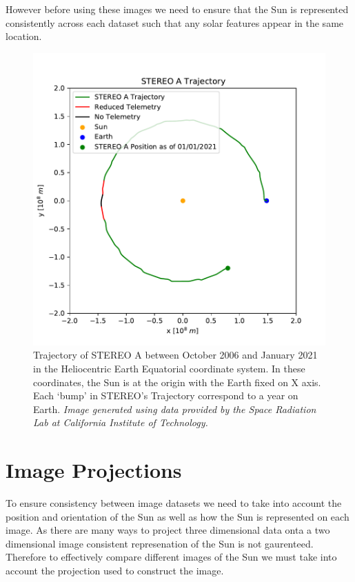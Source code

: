 \documentclass[11pt,a4paper,onecolumn]{report}
\begin{document}
However before using these images we need to ensure that the Sun is represented
consistently across each dataset such that any solar features appear in the
same location.

\begin{figure}[ht]
  \centering
  \includegraphics[width = 0.7\linewidth]{STEREO_pos.pdf}
  \caption[STEREO A Trajectory]{Trajectory of STEREO A between October 2006 and January 2021 in the
  Heliocentric Earth Equatorial coordinate system. In these coordinates, the Sun
  is at the origin with the Earth fixed on X axis. Each `bump' in STEREO's
  Trajectory correspond to a year on Earth. \textit{Image generated using
  data provided by the Space Radiation Lab at California Institute of Technology.}}
  \label{fig:stereo_pos}
\end{figure}


\section{Image Projections}
\label{sec:proj}
To ensure consistency between image datasets we need to take into account the
position and orientation of the Sun as well as how the Sun is represented on
each image. As there are many ways to project three dimensional data onta a two
dimensional image consistent represenation of the Sun is not gaurenteed.
Therefore to effectively compare different images of the Sun we must take into
account the projection used to construct the image.
\end{document}
